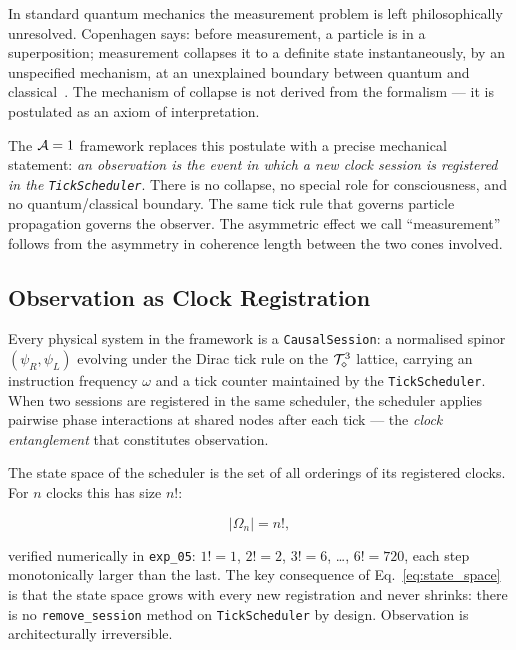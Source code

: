 \label{sec:observer}

In standard quantum mechanics the measurement problem is left
philosophically unresolved.  Copenhagen says: before measurement, a
particle is in a superposition; measurement collapses it to a definite
state instantaneously, by an unspecified mechanism, at an unexplained
boundary between quantum and classical~\cite{bohr1928}.  The mechanism
of collapse is not derived from the formalism — it is postulated as an
axiom of interpretation.

The $\mathcal{A}=1$ framework replaces this postulate with a precise mechanical
statement: \emph{an observation is the event in which a new clock
session is registered in the \texttt{TickScheduler}}.  There is no
collapse, no special role for consciousness, and no quantum/classical
boundary.  The same tick rule that governs particle propagation governs
the observer.  The asymmetric effect we call ``measurement'' follows
from the asymmetry in coherence length between the two cones involved.

\subsection{Observation as Clock Registration}
\label{subsec:observation}

Every physical system in the framework is a \texttt{CausalSession}: a
normalised spinor $(\psi_R, \psi_L)$ evolving under the Dirac tick rule
on the $\mathcal{T}_\diamond^3$ lattice, carrying an instruction frequency $\omega$
and a tick counter maintained by the \texttt{TickScheduler}.  When two
sessions are registered in the same scheduler, the scheduler applies
pairwise phase interactions at shared nodes after each tick — the
\emph{clock entanglement} that constitutes observation.

The state space of the scheduler is the set of all orderings of its
registered clocks.  For $n$ clocks this has size $n!$:

\begin{equation}
    |\Omega_n| = n!,
    \label{eq:state_space}
\end{equation}

verified numerically in \texttt{exp\_05}: $1! = 1$, $2! = 2$, $3! = 6$,
\ldots, $6! = 720$, each step monotonically larger than the last.  The
key consequence of Eq.~\eqref{eq:state_space} is that the state space
grows with every new registration and never shrinks: there is no
\texttt{remove\_session} method on \texttt{TickScheduler} by design.
Observation is architecturally irreversible.

